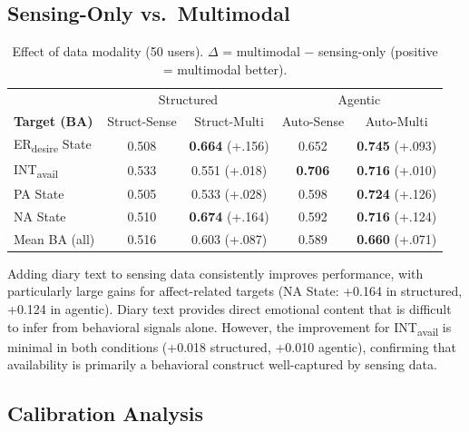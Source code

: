 \documentclass[screen,review,anonymous]{acmart}
\newcommand{\erdesire}{ER\textsubscript{desire}}
\newcommand{\intavail}{INT\textsubscript{avail}}
\begin{document}
\subsection{Sensing-Only vs.\ Multimodal}
\label{sec:results_modality}

\begin{table}[t]
\caption{Effect of data modality (50 users). $\Delta$ = multimodal $-$ sensing-only (positive = multimodal better).}
\label{tab:modality}
\small
\begin{tabular}{l cc cc}
\toprule
& \multicolumn{2}{c}{Structured} & \multicolumn{2}{c}{Agentic} \\
\textbf{Target (BA)} & Struct-Sense & Struct-Multi & Auto-Sense & Auto-Multi \\
\midrule
\erdesire{} State & 0.508 & \textbf{0.664} {\scriptsize (+.156)} & 0.652 & \textbf{0.745} {\scriptsize (+.093)} \\
\intavail{} & 0.533 & 0.551 {\scriptsize (+.018)} & \textbf{0.706} & \textbf{0.716} {\scriptsize (+.010)} \\
PA State & 0.505 & 0.533 {\scriptsize (+.028)} & 0.598 & \textbf{0.724} {\scriptsize (+.126)} \\
NA State & 0.510 & \textbf{0.674} {\scriptsize (+.164)} & 0.592 & \textbf{0.716} {\scriptsize (+.124)} \\
\addlinespace
Mean BA (all) & 0.516 & 0.603 {\scriptsize (+.087)} & 0.589 & \textbf{0.660} {\scriptsize (+.071)} \\
\bottomrule
\end{tabular}
\end{table}

Adding diary text to sensing data consistently improves performance, with particularly large gains for affect-related targets (NA State: +0.164 in structured, +0.124 in agentic). Diary text provides direct emotional content that is difficult to infer from behavioral signals alone. However, the improvement for \intavail{} is minimal in both conditions (+0.018 structured, +0.010 agentic), confirming that availability is primarily a behavioral construct well-captured by sensing data.

\subsection{Calibration Analysis}
\end{document}
